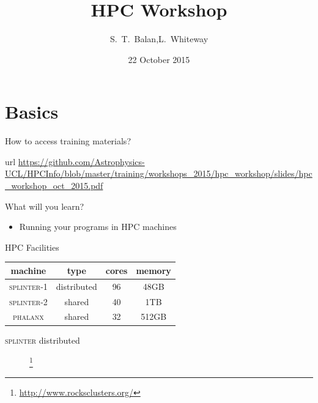\documentclass{beamer}
\title[HPC Workshop] %
{HPC Workshop}
\author[Balan,Whiteway] %
{S.~T.~Balan,L.~Whiteway}
\institute[UCL]
{
  Department of Physics and Astronomy\\
  University College London
}
\date[HPC 2015]
{22 October 2015}
\begin{document}
\frame{\titlepage}

\section{Basics}

\begin{frame}{How to access training materials?}
  \begin{block}{url}
    \url{https://github.com/Astrophysics-UCL/HPCInfo/blob/master/training/workshops_2015/hpc_workshop/slides/hpc_workshop_oct_2015.pdf}
  \end{block}
\end{frame}


\begin{frame}{What will you learn?}
  \begin{itemize}
    \item Running your programs in HPC machines
  \end{itemize}
\end{frame}


\begin{frame}{HPC Facilities}
  \begin{table}
    \begin{tabular}{|c|c|c|c|}
      \hline
      machine & type & cores & memory  \\
      \hline
      \textsc{splinter}-1 & distributed & 96 & 48GB  \\
      \textsc{splinter}-2 & shared & 40 & 1TB \\
      \textsc{phalanx} & shared & 32 & 512GB \\
      \hline
    \end{tabular}
  \end{table}
\end{frame}

\begin{frame}{\textsc{splinter} distributed}
  \begin{figure}
    \begin{center}
      \footnote{\url{http://www.rocksclusters.org/}}
    \end{center}
  \end{figure}
\end{frame}
\end{document}
